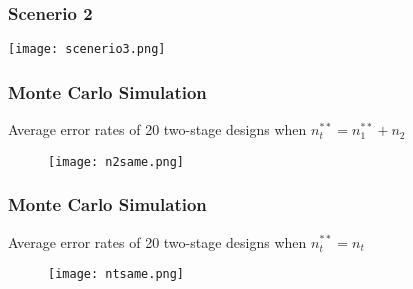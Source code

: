 \documentclass{beamer}\usepackage[]{graphicx}\usepackage[]{color}
\begin{document}
% 

\begin{frame}
\frametitle{Scenerio 2}
\texttt{[image: scenerio3.png]}
\end{frame}



\begin{frame}
\frametitle{\small Monte Carlo Simulation}
\footnotesize
\vspace{-0.5mm}
Average error rates of 20 two-stage designs when $n_t^{\ast\ast} = n_1^{\ast\ast} + n_2$
\vspace{-4.5mm}
\begin{figure}
\texttt{[image: n2same.png]}
\end{figure}
\end{frame}

\begin{frame}
\frametitle{\small Monte Carlo Simulation}
\footnotesize
\vspace{-0.5mm}
Average error rates of 20 two-stage designs when $n_t^{\ast\ast} = n_t$
\vspace{-4.5mm}
\begin{figure}
\texttt{[image: ntsame.png]}
\end{figure}
\end{frame}
\end{document}
